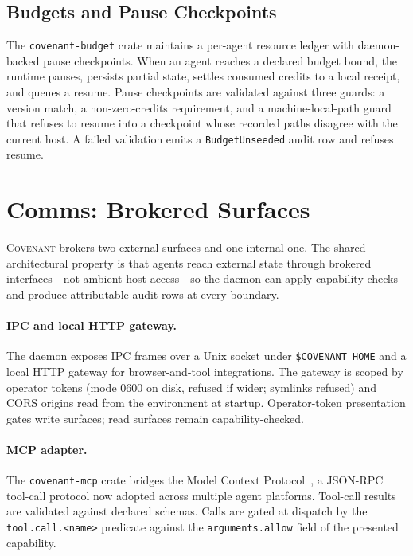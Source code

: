 \documentclass[11pt]{article}
\theoremstyle{plainsmall}
\begin{document}
\subsection{Budgets and Pause Checkpoints}

The \texttt{covenant-budget} crate maintains a per-agent resource ledger with daemon-backed pause checkpoints. When an agent reaches a declared budget bound, the runtime pauses, persists partial state, settles consumed credits to a local receipt, and queues a resume. Pause checkpoints are validated against three guards: a version match, a non-zero-credits requirement, and a machine-local-path guard that refuses to resume into a checkpoint whose recorded paths disagree with the current host. A failed validation emits a \texttt{BudgetUnseeded} audit row and refuses resume.

\section{Comms: Brokered Surfaces}
\label{sec:comms}

\textsc{Covenant} brokers two external surfaces and one internal one. The shared architectural property is that agents reach external state through brokered interfaces---not ambient host access---so the daemon can apply capability checks and produce attributable audit rows at every boundary.

\paragraph{IPC and local HTTP gateway.}
The daemon exposes IPC frames over a Unix socket under \texttt{\$COVENANT\_HOME} and a local HTTP gateway for browser-and-tool integrations. The gateway is scoped by operator tokens (mode 0600 on disk, refused if wider; symlinks refused) and CORS origins read from the environment at startup. Operator-token presentation gates write surfaces; read surfaces remain capability-checked.

\paragraph{MCP adapter.}
The \texttt{covenant-mcp} crate bridges the Model Context Protocol~\cite{mcp}, a JSON-RPC tool-call protocol now adopted across multiple agent platforms. Tool-call results are validated against declared schemas. Calls are gated at dispatch by the \texttt{tool.call.<name>} predicate against the \texttt{arguments.allow} field of the presented capability.
\end{document}
